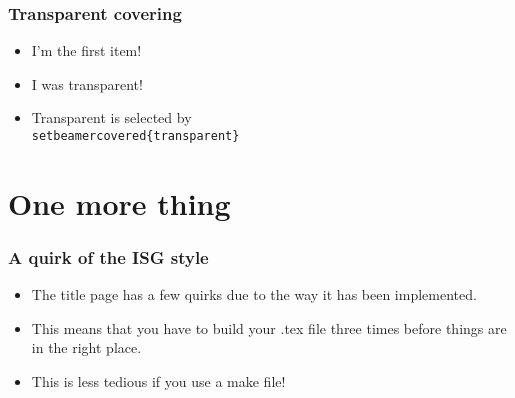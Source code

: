 \documentclass[]{beamer}
\begin{document}
\begin{frame}\frametitle{Transparent covering}
\begin{itemize}
	\item I'm the first item!
	\pause
	\item I was transparent!
	\pause
	\item Transparent is selected by \texttt{\\setbeamercovered\{transparent\}}
\end{itemize}
\end{frame}

\section{One more thing}
\begin{frame}\frametitle{A quirk of the ISG style}
\begin{itemize}
	\item The title page has a few quirks due to the way it has been implemented.
	\item This means that you have to build your .tex file three times before things are in the right place.
	\item This is less tedious if you use a make file!
\end{itemize}
\end{frame}
\end{document}
